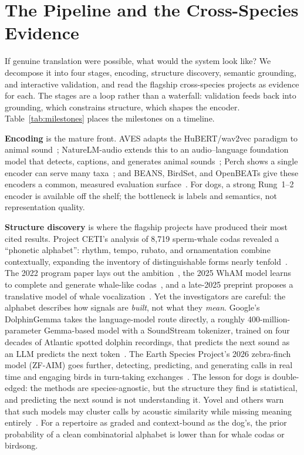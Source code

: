 \section{The Pipeline and the Cross-Species Evidence}
\label{sec:pipeline}
\label{sec:crossspecies}

If genuine translation were possible, what would the system look like? We
decompose it into four stages, encoding, structure discovery, semantic
grounding, and interactive validation, and read the flagship cross-species
projects as evidence for each. The stages are a loop rather than a
waterfall: validation feeds back into grounding, which constrains structure,
which shapes the encoder. Table~\ref{tab:milestones} places the milestones
on a timeline.

\textbf{Encoding} is the mature front. AVES adapts the HuBERT/wav2vec
paradigm to animal sound~\cite{hagiwara2023aves}; NatureLM-audio extends this
to an audio--language foundation model that detects, captions, and generates
animal sounds~\cite{robinson2024naturelm}; Perch shows a single encoder can
serve many taxa~\cite{ghani2023perch}; and BEANS, BirdSet, and OpenBEATs give
these encoders a common, measured evaluation
surface~\cite{hagiwara2023beans,openbeats2025}. For dogs, a strong Rung~1--2
encoder is available off the shelf; the bottleneck is labels and semantics,
not representation quality.

\textbf{Structure discovery} is where the flagship projects have produced
their most cited results. Project CETI's analysis of 8{,}719 sperm-whale
codas revealed a ``phonetic alphabet'': rhythm, tempo, rubato, and
ornamentation combine contextually, expanding the inventory of
distinguishable forms nearly tenfold~\cite{sharma2024whale}. The 2022 program
paper lays out the ambition~\cite{andreas2022ceti}, the 2025 WhAM model
learns to complete and generate whale-like codas~\cite{wham2025}, and a
late-2025 preprint proposes a translative model of whale
vocalization~\cite{arxiv2025whaletrans}. Yet the investigators are careful:
the alphabet describes how signals are \emph{built}, not what they
\emph{mean}. Google's DolphinGemma takes the language-model route directly,
a roughly 400-million-parameter Gemma-based model with a SoundStream
tokenizer, trained on four decades of Atlantic spotted dolphin recordings,
that predicts the next sound as an LLM predicts the next
token~\cite{google2025dolphingemma}. The Earth Species Project's 2026
zebra-finch model (ZF-AIM) goes further, detecting, predicting, and
generating calls in real time and engaging birds in turn-taking
exchanges~\cite{esp2026finch}. The lesson for dogs is double-edged: the
methods are species-agnostic, but the structure they find is statistical,
and predicting the next sound is not understanding it. Yovel and others
warn that such models may cluster calls by acoustic similarity while
missing meaning entirely~\cite{yovel2025critique}. For a repertoire as
graded and context-bound as the dog's, the prior probability of a clean
combinatorial alphabet is lower than for whale codas or birdsong.


